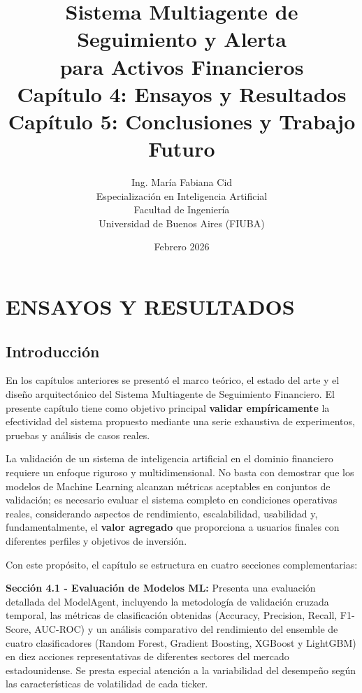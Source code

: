 \documentclass[12pt,a4paper]{report}
\title{
    \textbf{Sistema Multiagente de Seguimiento y Alerta}\\
    \textbf{para Activos Financieros}\\
    \vspace{1cm}
    \large Capítulo 4: Ensayos y Resultados\\
    Capítulo 5: Conclusiones y Trabajo Futuro
}
\author{
    Ing. María Fabiana Cid\\
    \vspace{0.5cm}
    \small Especialización en Inteligencia Artificial\\
    \small Facultad de Ingeniería\\
    \small Universidad de Buenos Aires (FIUBA)
}
\date{Febrero 2026}
\begin{document}
\maketitle

\tableofcontents
\newpage


\chapter{ENSAYOS Y RESULTADOS}

\section*{Introducción}

En los capítulos anteriores se presentó el marco teórico, el estado del arte y el diseño arquitectónico del Sistema Multiagente de Seguimiento Financiero. El presente capítulo tiene como objetivo principal \textbf{validar empíricamente} la efectividad del sistema propuesto mediante una serie exhaustiva de experimentos, pruebas y análisis de casos reales.

La validación de un sistema de inteligencia artificial en el dominio financiero requiere un enfoque riguroso y multidimensional. No basta con demostrar que los modelos de Machine Learning alcanzan métricas aceptables en conjuntos de validación; es necesario evaluar el sistema completo en condiciones operativas reales, considerando aspectos de rendimiento, escalabilidad, usabilidad y, fundamentalmente, el \textbf{valor agregado} que proporciona a usuarios finales con diferentes perfiles y objetivos de inversión.

Con este propósito, el capítulo se estructura en cuatro secciones complementarias:

\textbf{Sección 4.1 - Evaluación de Modelos ML:} Presenta una evaluación detallada del ModelAgent, incluyendo la metodología de validación cruzada temporal, las métricas de clasificación obtenidas (Accuracy, Precision, Recall, F1-Score, AUC-ROC) y un análisis comparativo del rendimiento del ensemble de cuatro clasificadores (Random Forest, Gradient Boosting, XGBoost y LightGBM) en diez acciones representativas de diferentes sectores del mercado estadounidense. Se presta especial atención a la variabilidad del desempeño según las características de volatilidad de cada ticker.
\end{document}
